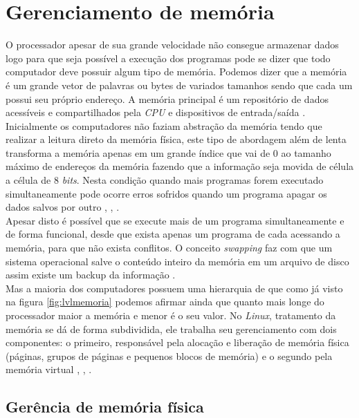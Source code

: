 \chapter{Gerenciamento de memória}\label{cap:GerenciamentoMemoria}

O processador apesar de sua grande velocidade não consegue armazenar dados logo para que seja possível a execução dos programas pode se dizer que todo computador deve possuir algum tipo de memória.
Podemos dizer que a memória é um grande vetor de palavras ou bytes de variados tamanhos sendo que cada um possui seu próprio endereço. A memória principal é um repositório de dados acessíveis e compartilhados pela \emph{CPU} e dispositivos de entrada/saída \cite{ufscar2019}.\\
Inicialmente os computadores não faziam abstração da memória tendo que realizar a leitura direto da memória física, este tipo de abordagem além de lenta transforma a memória apenas em um grande índice que vai de 0 ao tamanho máximo de endereços da memória fazendo que a informação seja movida de célula a célula de 8 \emph{bits}. Nesta condição quando mais programas forem executado simultaneamente pode ocorre erros sofridos quando um programa apagar os dados salvos por outro \cite{ufscar2019}, \cite{silberschatz2000}, \cite{stallings2004}.\\
Apesar disto é possível que se execute mais de um programa simultaneamente e de forma funcional, desde que exista apenas um programa de cada acessando a memória, para que não exista conflitos. O conceito \emph{swapping} faz com que um sistema operacional salve o conteúdo inteiro da memória em um arquivo de disco assim existe um backup da informação \cite{Tanenbaum2016}.\\
Mas a maioria dos computadores possuem uma hierarquia de que como já visto na figura \ref{fig:lvlmemoria} podemos afirmar ainda que quanto mais longe do processador maior a memória e menor é o seu valor.
No \emph{Linux}, tratamento da memória se dá de forma subdividida, ele trabalha seu gerenciamento com dois componentes: o primeiro, responsável pela alocação e liberação de memória física (páginas, grupos de páginas e pequenos blocos de memória) e o segundo pela memória virtual \cite{ufscar2019}, \cite{silberschatz2000}, \cite{stallings2004}.

\section{Gerência de memória física}

